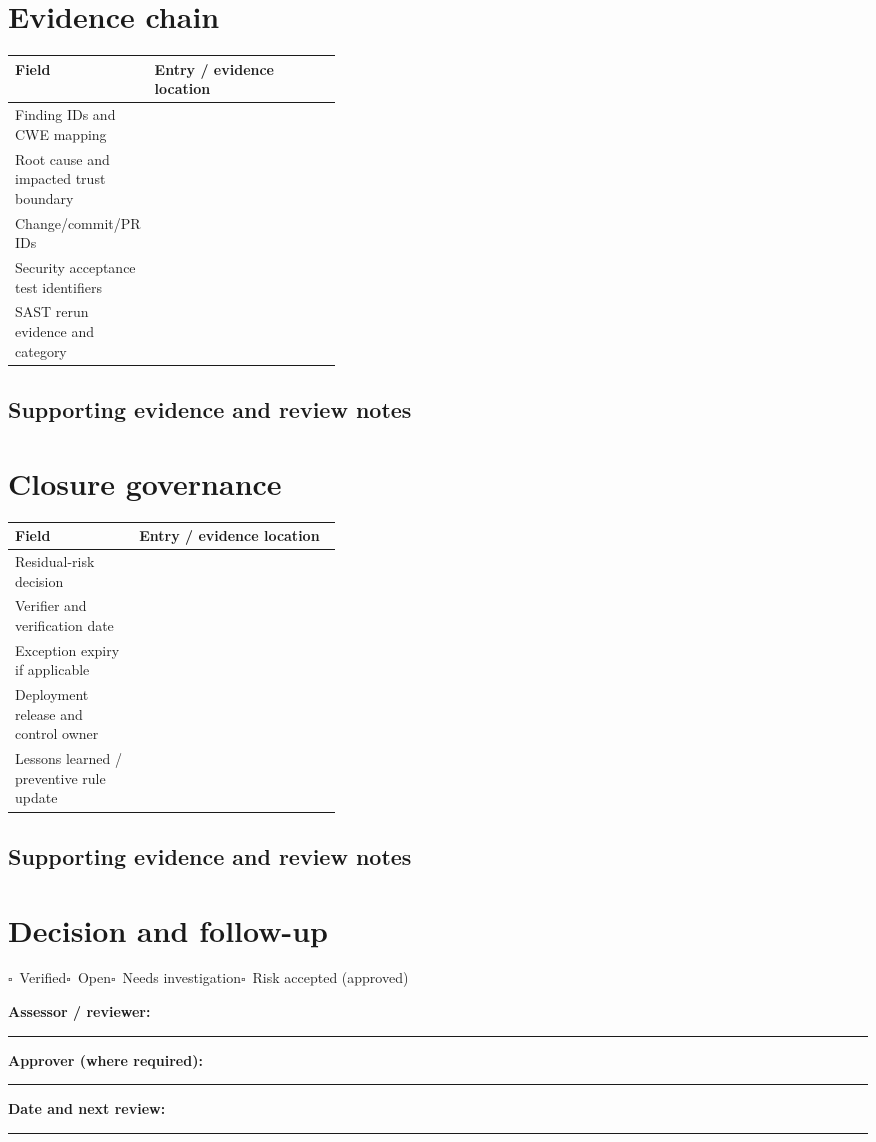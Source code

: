 \documentclass[10pt,letterpaper]{article}
\newcommand{\checkbox}{\(\square\)}
\newcommand{\blankline}{\noindent\rule{\linewidth}{0.35pt}\par\vspace{4pt}}
\newcommand{\writearea}[1]{\par\begin{tcolorbox}[colback=white,colframe=linegray,boxrule=0.5pt,height=#1,sharp corners]\mbox{}\end{tcolorbox}\par}
\begin{document}
\section{Evidence chain}
\begin{tabularx}{\linewidth}{@{}p{0.38\linewidth}Y@{}}
\toprule Field & Entry / evidence location\\\midrule
Finding IDs and CWE mapping & \\[1.0em]
\midrule
Root cause and impacted trust boundary & \\[1.0em]
\midrule
Change/commit/PR IDs & \\[1.0em]
\midrule
Security acceptance test identifiers & \\[1.0em]
\midrule
SAST rerun evidence and category & \\[1.0em]
\midrule
\end{tabularx}
\subsection{Supporting evidence and review notes}
\writearea{1.45in}
\clearpage
\section{Closure governance}
\begin{tabularx}{\linewidth}{@{}p{0.38\linewidth}Y@{}}
\toprule Field & Entry / evidence location\\\midrule
Residual-risk decision & \\[1.0em]
\midrule
Verifier and verification date & \\[1.0em]
\midrule
Exception expiry if applicable & \\[1.0em]
\midrule
Deployment release and control owner & \\[1.0em]
\midrule
Lessons learned / preventive rule update & \\[1.0em]
\midrule
\end{tabularx}
\subsection{Supporting evidence and review notes}
\writearea{1.45in}
\clearpage
\section{Decision and follow-up}
\noindent\checkbox\ Verified\quad\checkbox\ Open\quad\checkbox\ Needs investigation\quad\checkbox\ Risk accepted (approved)\par
\noindent\textbf{Assessor / reviewer:}\par\blankline\textbf{Approver (where required):}\par\blankline\textbf{Date and next review:}\par\blankline
\writearea{1.7in}
\end{document}
